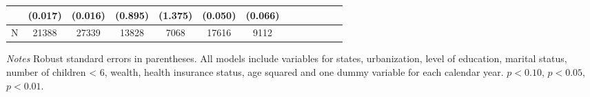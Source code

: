 \documentclass[10pt,letterpaper]{article}
\begin{document}
\begin{table}[!ht]
\begin{center}
\begin{adjustbox}{max width=\linewidth}
\begin{threeparttable}
{\begin{tabular}{l*{6}{S S}}
						&  (0.017)         &  (0.016)         &  (0.895)         &  (1.375)         &  (0.050)         &  (0.066)         \\
						\midrule
						N         &    21388         &    27339         &    13828         &     7068         &    17616         &     9112         \\
						\bottomrule
					\end{tabular}
					\begin{tablenotes}
						\item \footnotesize \textit{Notes} Robust standard errors in parentheses. All models include variables for  states, urbanization, level of education, marital status, number of children < 6, wealth, health insurance status, age squared and one dummy variable for each calendar year. \sym{*} \(p<0.10\), \sym{**} \(p<0.05\), \sym{***} \(p<0.01\).
					\end{tablenotes}
				}
			\end{threeparttable}
		\end{adjustbox}
	\end{center}
\end{table} 
\end{document}
